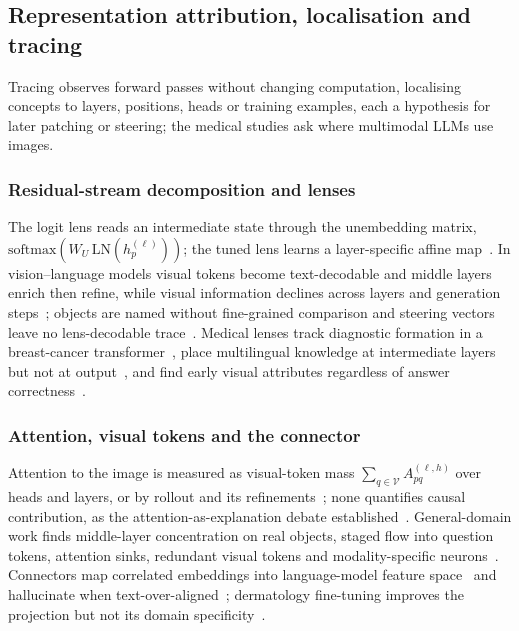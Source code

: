 \subsection{Representation attribution, localisation and tracing}
\label{sec:tracing}

Tracing observes forward passes without changing computation, localising concepts to layers,
positions, heads or training examples, each a hypothesis for later patching or steering; the medical
studies ask where multimodal LLMs use images.

\subsubsection{Residual-stream decomposition and lenses}

The logit lens reads an intermediate state through the unembedding matrix,
$\mathrm{softmax}(W_U\,\mathrm{LN}(h^{(\ell)}_p))$; the tuned lens learns a layer-specific affine
map~\cite{belrose2023eliciting}. In vision--language models visual tokens become text-decodable and
middle layers enrich then refine, while visual information declines across layers and generation
steps~\cite{neo2024towards,jiang2024devils,li2025the}; objects are named without fine-grained
comparison and steering vectors leave no lens-decodable
trace~\cite{shahgir2026vlms,nadaf2026steerable}. Medical lenses track diagnostic formation in a
breast-cancer transformer~\cite{takahashi2026vision}, place multilingual knowledge at intermediate
layers but not at output~\cite{abouzahir2026bridging}, and find early visual attributes regardless
of answer correctness~\cite{nooralahzadeh2026arbitration}.

\subsubsection{Attention, visual tokens and the connector}

Attention to the image is measured as visual-token mass $\sum_{q\in\mathcal V}A^{(\ell,h)}_{pq}$
over heads and layers, or by rollout and its
refinements~\cite{abnar2020quantifying,chefer2021transformer}; none quantifies causal contribution,
as the attention-as-explanation debate
established~\cite{jain2019attention,wiegreffe2019attention,serrano2019is}. General-domain work finds
middle-layer concentration on real objects, staged flow into question tokens, attention sinks,
redundant visual tokens and modality-specific
neurons~\cite{jiang2024devils,zhang2024cross,kang2025you,luo2025sink,chen2024image,wang2025token,huo2024mmneuron,huang2024miner,kang2025large,kim2025interpreting,jiang2025investigating}.
Connectors map correlated embeddings into language-model feature
space~\cite{lee2026more,venhoff2025visual} and hallucinate when
text-over-aligned~\cite{fan2026visual,venhoff2025too,saini2026when}; dermatology fine-tuning
improves the projection but not its domain specificity~\cite{verma2024cross}.

